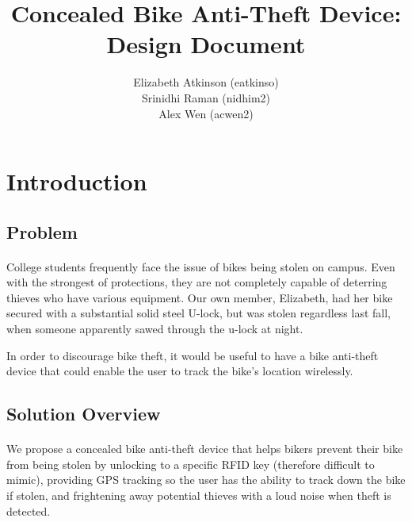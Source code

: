 \documentclass{article}
\begin{document}
\begin{titlepage}
	\title{Concealed Bike Anti-Theft Device: Design Document}
	\author{Elizabeth Atkinson (eatkinso)\\ Srinidhi Raman (nidhim2) \\ Alex Wen (acwen2) }
\end{titlepage}



\maketitle{}

\tableofcontents


\section{Introduction}
\subsection{Problem}

\paragraph{}
College students frequently face the issue of bikes being stolen on campus. Even with the strongest of protections, they are not completely capable of deterring thieves who have various equipment. Our own member, Elizabeth, had her bike secured with a substantial solid steel U-lock, but was stolen regardless last fall, when someone apparently sawed through the u-lock at night. 

In order to discourage bike theft, it would be useful to have a bike anti-theft device that could enable the user to track the bike's location wirelessly. 

\subsection{Solution Overview}
\paragraph{}
We propose a concealed bike anti-theft device that helps bikers prevent their bike from being stolen by unlocking to a specific RFID key (therefore difficult to mimic), providing GPS tracking so the user has the ability to track down the bike if stolen, and frightening away potential thieves with a loud noise when theft is detected.
\end{document}
